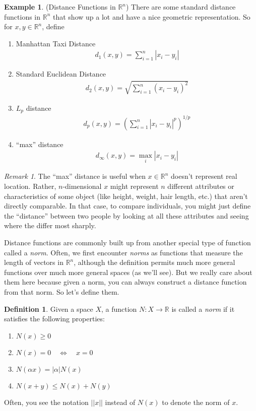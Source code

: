 \documentclass[12pt]{article}
\theoremstyle{plain}
\theoremstyle{definition}
\newtheorem{defn}[thm]{Definition}
\newtheorem{ex}[thm]{Example}
\theoremstyle{remark}
\newtheorem*{rmk}{Remark}
\newcommand{\R}{\mathbb{R}}
\begin{document}
\begin{ex}{(Distance Functions in $\R^n$)}
There are some standard distance functions in $\R^n$ that show
up a lot and have a nice geometric representation. So for $x,y\in
\R^n$, define
\begin{enumerate}
  \item Manhattan Taxi Distance
    \begin{align*}
      d_1(x,y) = \sum^n_{i=1} |x_i - y_i|
    \end{align*}

  \item Standard Euclidean Distance
    \begin{align*}
      d_2(x,y) = \sqrt{\sum^n_{i=1} (x_i - y_i)^2}
    \end{align*}

  \item $L_p$ distance
    \begin{align*}
      d_p(x,y) = \left(\sum^n_{i=1} |x_i - y_i|^p\right)^{1/p}
    \end{align*}

  \item ``max'' distance
    \begin{align*}
      d_\infty(x,y) = \max_{i} |x_i-y_i|
    \end{align*}

\end{enumerate}
\end{ex}
\begin{rmk}
The ``max'' distance is useful when $x\in\R^n$ doesn't represent
real location. Rather, $n$-dimensional $x$ might represent $n$ different
attributes or characteristics of some object (like height, weight, hair
length, etc.) that aren't directly comparable. In that case, to compare
individuals, you might just define the ``distance'' between two people
by looking at all these attributes and seeing where the differ most
sharply.
\end{rmk}

Distance functions are commonly built up from another special type of
function called a \emph{norm}. Often, we first encounter \emph{norms} as
functions that measure the length of vectors in $\R^n$, although
the definition permits much more general functions over much more
general spaces (as we'll see). But we really care about them here
because given a norm, you can always construct a distance function from
that norm. So let's define them.

\begin{defn}
\label{defn:norm}
Given a space $X$, a function $N:X\rightarrow \R$ is called a
\emph{norm} if it satisfies the following properties:
\begin{enumerate}
  \item $N(x)\geq 0$
  \item $N(x)=0 \quad \Leftrightarrow \quad x=0$
  \item $N(\alpha x)= |\alpha| N(x)$
  \item $N(x+y) \leq N(x) + N(y)$
\end{enumerate}
Often, you see the notation $||x||$ instead of $N(x)$ to denote the norm
of $x$.
\end{defn}
\end{document}
